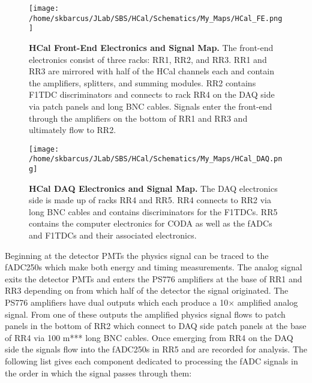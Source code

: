 \documentclass[oneside]{book}   %
\begin{document}
	\begin{figure}[!ht]
	\begin{center}
	\texttt{[image: /home/skbarcus/JLab/SBS/HCal/Schematics/My\_Maps/HCal\_FE.png]}
	\end{center}
	\caption{
	{\bf{HCal Front-End Electronics and Signal Map.}} The front-end electronics consist of three racks: RR1, RR2, and RR3. RR1 and RR3 are mirrored with half of the HCal channels each and contain the amplifiers, splitters, and summing modules. RR2 contains F1TDC discriminators and connects to rack RR4 on the DAQ side via patch panels and long BNC cables. Signals enter the front-end through the amplifiers on the bottom of RR1 and RR3 and ultimately flow to RR2.}
	\label{fig:fe}
	\end{figure}	
	
	\begin{figure}[!ht]
	\begin{center}
	\texttt{[image: /home/skbarcus/JLab/SBS/HCal/Schematics/My\_Maps/HCal\_DAQ.png]}
	\end{center}
	\caption{
	{\bf{HCal DAQ Electronics and Signal Map.}} The DAQ electronics side is made up of racks RR4 and RR5. RR4 connects to RR2 via long BNC cables and contains discriminators for the F1TDCs. RR5 contains the computer electronics for CODA as well as the fADCs and F1TDCs and their associated electronics.}
	\label{fig:daq}
	\end{figure}		

Beginning at the detector PMTs the physics signal can be traced to the fADC250s which make both energy and timing measurements. The analog signal exits the detector PMTs and enters the PS776 amplifiers at the base of RR1 and RR3 depending on from which half of the detector the signal originated. The PS776 amplifiers have dual outputs which each produce a 10$\times$ amplified analog signal. From one of these outputs the amplified physics signal flows to patch panels in the bottom of RR2 which connect to DAQ side patch panels at the base of RR4 via 100 m*** long BNC cables. Once emerging from RR4 on the DAQ side the signals flow into the fADC250s in RR5 and are recorded for analysis. The following list gives each component dedicated to processing the fADC signals in the order in which the signal passes through them:\\
\end{document}
